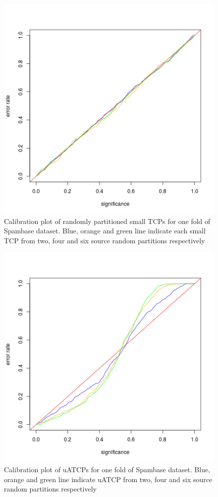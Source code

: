 \documentclass[main]{subfiles}
\begin{document}
\begin{figure}[H]
\begin{center}
  \includegraphics[scale=0.6]{images/eqSourceInd}
 \caption{Calibration plot of randomly partitioned small TCPs for one fold of  Spambase dataset. Blue, orange and  green line indicate each small TCP from two, four and six source random partitions respectively }\label{fig:valIndividual}
\end{center}
\end{figure}

\begin{figure}[H]
\begin{center}
  \includegraphics[scale=0.6]{images/eqSourceCombined}
 \caption{Calibration plot of uATCPs for one fold of Spambase dataset. Blue, orange and  green line indicate uATCP from two, four and six source random partitions respectively }\label{fig:valCombined}
\end{center}
\end{figure}
\end{document}
